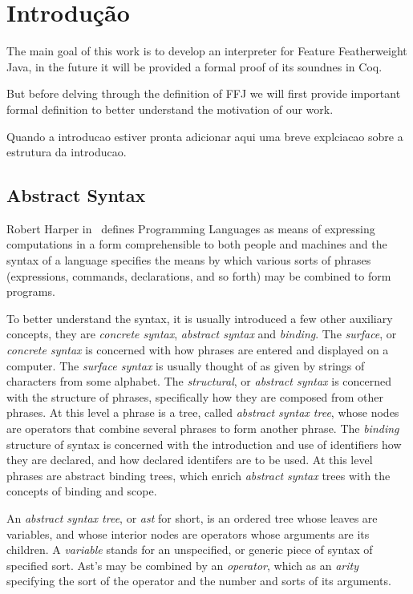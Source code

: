 \chapter{Introdução}


The main goal of this work is to develop an interpreter for Feature
Featherweight Java, in the future it will be provided a formal proof of its
soundnes in Coq.

But before delving through the definition of FFJ we will first provide
important formal definition to better understand the motivation of our work.

Quando a introducao estiver pronta adicionar aqui uma breve explciacao sobre a
estrutura da introducao.

\section{Abstract Syntax}
Robert Harper in~\cite{practicalFoundations} defines Programming Languages
as means of expressing computations in a form comprehensible to
both people and machines and the syntax of a language specifies the means
by which various sorts of phrases (expressions, commands, declarations, and
so forth) may be combined to form programs.

To better understand the syntax, it is usually introduced a few other auxiliary
concepts, they are \textit{concrete syntax}, \textit{abstract syntax} and
\textit{binding}.
The \textit{surface}, or \textit{concrete syntax} is concerned with how
phrases are entered and displayed on a computer. The \textit{surface
syntax} is usually thought of as given by strings of characters from some
alphabet. 
The \textit{structural}, or \textit{abstract syntax} is concerned
with the structure of phrases, specifically how they are composed from
other phrases. 
At this level a phrase is a tree, called \textit{abstract
syntax tree}, whose nodes are operators that combine several phrases to
form another phrase. The \textit{binding} structure of syntax is concerned
with the introduction and use of identifiers how they are declared, and how
declared identifers are to be used. At  this level phrases are abstract
binding trees, which enrich \textit{abstract syntax} trees with the
concepts of binding and scope.

An \textit{abstract syntax tree}, or \textit{ast} for short, is an
ordered tree whose leaves are variables, and whose interior nodes are
operators whose arguments are its children. A \textit{variable} stands
for an unspecified, or generic piece of syntax of specified sort. Ast's
may be combined by an \textit{operator}, which as an \textit{arity}
specifying the sort of the operator and the number and sorts of its
arguments. 

